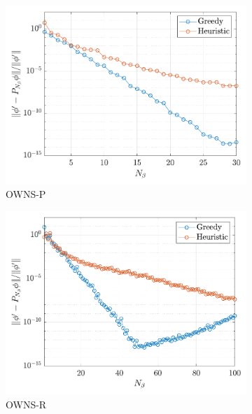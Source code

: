 \begin{figure}
    \centering
    \begin{subfigure}[b]{0.48\textwidth}
        \centering
        \includegraphics[width=1\linewidth]{figures/Mixing_Err_P.pdf}
        \caption{OWNS-P}
        \label{fig:mixing-err-p}
    \end{subfigure}
    \begin{subfigure}[b]{0.48\textwidth}
        \centering
        \includegraphics[width=1\linewidth]{figures/Mixing_Err_R.pdf}
        \caption{OWNS-R}
        \label{fig:mixing-err-r}
    \end{subfigure}\\
        \centering
    \begin{subfigure}[b]{0.48\textwidth}

\end{subfigure}
\end{figure}
